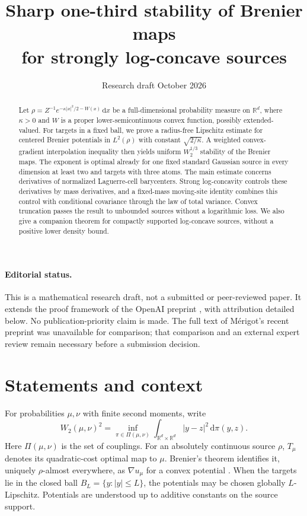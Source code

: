 \documentclass[11pt]{article}
\title{Sharp one-third stability of Brenier maps\\for strongly log-concave sources}
\author{}
\date{Research draft\quad 7 October 2026}
\numberwithin{equation}{section}
\theoremstyle{remark}
\newcommand{\R}{\mathbb R}
\newcommand{\dd}{\,\mathrm d}
\begin{document}
\maketitle
\vspace{-1.5em}
\begin{abstract}
Let $\rho=Z^{-1}e^{-\kappa|x|^2/2-W(x)}\dd x$ be a full-dimensional probability measure on $\R^d$, where $\kappa>0$ and $W$ is a proper lower-semicontinuous convex function, possibly extended-valued. For targets in a fixed ball, we prove a radius-free Lipschitz estimate for centered Brenier potentials in $L^2(\rho)$ with constant $\sqrt{2/\kappa}$. A weighted convex-gradient interpolation inequality then yields uniform $W_2^{1/3}$ stability of the Brenier maps. The exponent is optimal already for one fixed standard Gaussian source in every dimension at least two and targets with three atoms. The main estimate concerns derivatives of normalized Laguerre-cell barycenters. Strong log-concavity controls these derivatives by mass derivatives, and a fixed-mass moving-site identity combines this control with conditional covariance through the law of total variance. Convex truncation passes the result to unbounded sources without a logarithmic loss. We also give a companion theorem for compactly supported log-concave sources, without a positive lower density bound.
\end{abstract}

\paragraph{Editorial status.}
This is a mathematical research draft, not a submitted or peer-reviewed paper. It extends the proof framework of the OpenAI preprint \cite{OpenAI2026}, with attribution detailed below. No publication-priority claim is made. The full text of M\'erigot's recent preprint \cite{Merigot2026} was unavailable for comparison; that comparison and an external expert review remain necessary before a submission decision.

\section{Statements and context}\label{sec:intro}
For probabilities $\mu,\nu$ with finite second moments, write
\[
 W_2(\mu,\nu)^2=\inf_{\pi\in\Pi(\mu,\nu)}
 \int_{\R^d\times\R^d}|y-z|^2\dd\pi(y,z).
\]
Here $\Pi(\mu,\nu)$ is the set of couplings. For an absolutely continuous source $\rho$, $T_\mu$ denotes its quadratic-cost optimal map to $\mu$. Brenier's theorem identifies it, uniquely $\rho$-almost everywhere, as $\nabla u_\mu$ for a convex potential \cite{Brenier1991}. When the targets lie in the closed ball $B_L=\{y:|y|\le L\}$, the potentials may be chosen globally $L$-Lipschitz. Potentials are understood up to additive constants on the source support.
\end{document}
